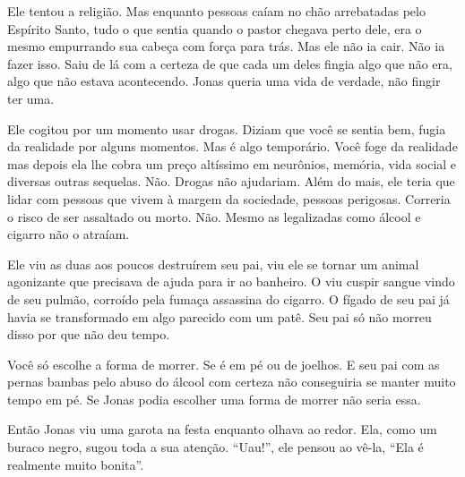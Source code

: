 Ele tentou a religião. Mas enquanto pessoas caíam no chão arrebatadas pelo Espírito Santo, tudo o que sentia quando o pastor chegava perto dele, era o mesmo empurrando sua cabeça com força para trás. Mas ele não ia cair. Não ia fazer isso. Saiu de lá com a certeza de que cada um deles fingia algo que não era, algo que não estava acontecendo. Jonas queria uma vida de verdade, não fingir ter uma.

Ele cogitou por um momento usar drogas. Diziam que você se sentia bem, fugia da realidade por alguns momentos. Mas é algo temporário. Você foge da realidade\mudanca{,} mas depois ela lhe cobra um preço altíssimo em neurônios, memória, vida social e diversas outras sequelas. Não. Drogas não ajudariam. Além do mais, ele teria que lidar com pessoas que vivem à margem da sociedade, pessoas perigosas. Correria o risco de ser assaltado ou morto. Não. Mesmo as legalizadas como álcool e cigarro não o atraíam.

Ele viu as duas aos poucos destruírem seu pai, viu ele se tornar um animal agonizante que precisava de ajuda para ir ao banheiro. O viu cuspir sangue vindo de seu pulmão, corroído pela fumaça assassina do cigarro. O fígado de seu pai já havia se transformado em algo parecido com um patê. Seu pai só não morreu disso por que não deu tempo.

Você só escolhe a forma de morrer. Se é em pé ou de joelhos. E seu pai com as pernas bambas pelo abuso do álcool com certeza não conseguiria se manter muito tempo em pé. Se Jonas podia escolher uma forma de morrer não seria essa.

Então Jonas viu uma garota na festa\mudanca{,} enquanto olhava ao redor. Ela, como um buraco negro, sugou toda a sua atenção. ``Uau!'', ele pensou ao vê-la, ``Ela é realmente muito bonita''.

